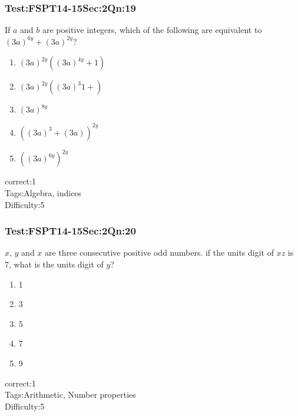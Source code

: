 \documentclass[]{beamer}
\begin{document}
    \begin{frame}
	    \frametitle{Test:FSPT14-15\hspace{2mm}Sec:2\hspace{2mm}Qn:19}
	    If $a$ and $b$ are positive integers, which of the following are equivalent to $ (3a)^{6y}+(3a)^{2y}$?   
	    \begin{enumerate}
	        \item
	            $(3a)^{2y}((3a)^{4y}+1)$
	        \item
	            $(3a)^{2y}((3a)^{3}1+)$
	        \item
	            $(3a)^{8y}$
	        \item
	            $((3a)^{3}+(3a))^{2y}$
	        \item
	            $((3a)^{6y})^{2y}$
	    \end{enumerate}
	    correct:1  \\   
	    Tags:Algebra, indices    \\
	    Difficulty:5  \\
    \end{frame}
    \begin{frame}
	    \frametitle{Test:FSPT14-15\hspace{2mm}Sec:2\hspace{2mm}Qn:20}
	     $x$, $y$ and $x$ are three consecutive positive odd numbers. if the units digit of $xz$ is 7, what is the units digit of $y$?  
	    \begin{enumerate}
	        \item
	            1	
	        \item
	            3
	        \item
	            5
	        \item
	            7
	        \item
	            9
	    \end{enumerate}
	    correct:1  \\   
	    Tags:Arithmetic, Number properties    \\
	    Difficulty:5   \\
    \end{frame}
\end{document}
